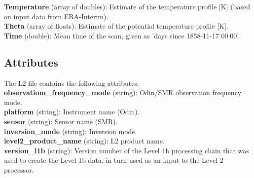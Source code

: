 \textbf{Temperature} (array of doubles): Estimate of the temperature profile [K] (based on input data from ERA-Interim). \\ %

\textbf{Theta} (array of floats): Estimate of the potential temperature profile [K]. \\

\textbf{Time} (double): Mean time of the scan, given as 'days since 1858-11-17 00:00'. \\ %

\subsection*{Attributes}

The L2 file contains the following attributes:\\

\textbf{observatiom\_frequency\_mode} (string): Odin/SMR observation frequency mode. \\ %

\textbf{platform} (string): Instrument name (Odin). \\

\textbf{sensor} (string): Sensor name (SMR). \\

\textbf{inversion\_mode} (string): Inversion mode. \\ %

\textbf{level2\_product\_name} (string): L2 product name. \\

\textbf{version\_l1b} (string): Version number of the Level 1b processing chain that was used to create the Level 1b data, in turn used as an input to the Level 2 processor. \\

